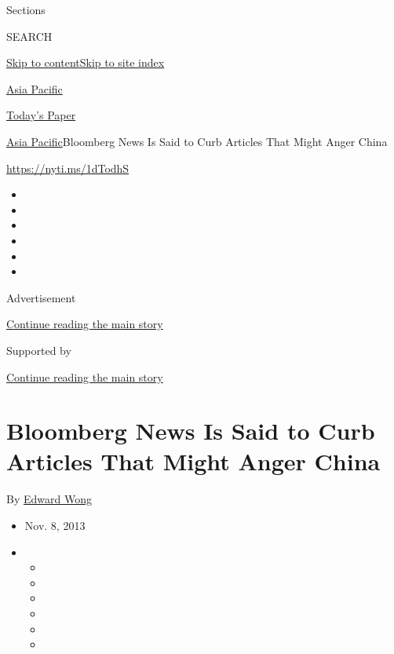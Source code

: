 Sections

SEARCH

\protect\hyperlink{site-content}{Skip to
content}\protect\hyperlink{site-index}{Skip to site index}

\href{https://www.nytimes3xbfgragh.onion/section/world/asia}{Asia
Pacific}

\href{https://myaccount.nytimes3xbfgragh.onion/auth/login?response_type=cookie\&client_id=vi}{}

\href{https://www.nytimes3xbfgragh.onion/section/todayspaper}{Today's
Paper}

\href{/section/world/asia}{Asia Pacific}\textbar{}Bloomberg News Is Said
to Curb Articles That Might Anger China

\url{https://nyti.ms/1dTodhS}

\begin{itemize}
\item
\item
\item
\item
\item
\item
\end{itemize}

Advertisement

\protect\hyperlink{after-top}{Continue reading the main story}

Supported by

\protect\hyperlink{after-sponsor}{Continue reading the main story}

\hypertarget{bloomberg-news-is-said-to-curb-articles-that-might-anger-china}{%
\section{Bloomberg News Is Said to Curb Articles That Might Anger
China}\label{bloomberg-news-is-said-to-curb-articles-that-might-anger-china}}

By \href{https://www.nytimes3xbfgragh.onion/by/edward-wong}{Edward Wong}

\begin{itemize}
\item
  Nov. 8, 2013
\item
  \begin{itemize}
  \item
  \item
  \item
  \item
  \item
  \item
  \end{itemize}
\end{itemize}

